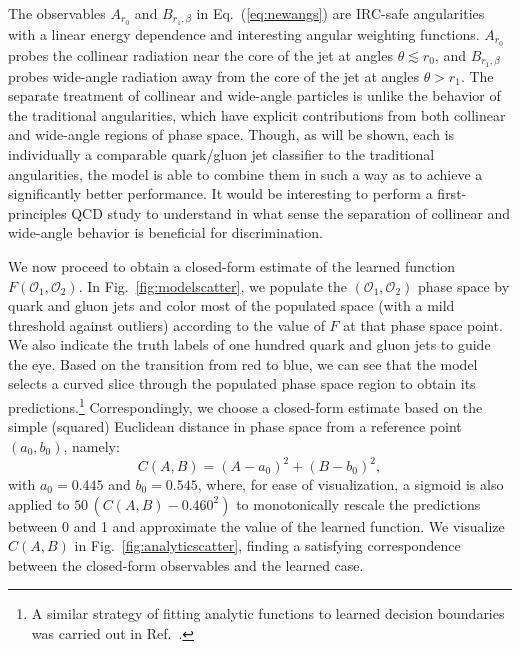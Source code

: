 \documentclass[letterpaper,11pt]{article}
\DeclareRobustCommand{\Fig}[1]{Fig.~\ref{#1}}
\DeclareRobustCommand{\Eq}[1]{Eq.~(\ref{#1})}
\DeclareRobustCommand{\Ref}[1]{Ref.~\cite{#1}}
\begin{document}
The observables $A_{r_0}$ and $B_{r_1,\beta}$ in \Eq{eq:newangs} are IRC-safe angularities with a linear energy dependence and interesting angular weighting functions.
%
$A_{r_0}$ probes the collinear radiation near the core of the jet at angles $\theta \lesssim r_0$, and $B_{r_1,\beta}$ probes wide-angle radiation away from the core of the jet at angles $\theta > r_1$.
%
The separate treatment of collinear and wide-angle particles is unlike the behavior of the traditional angularities, which have explicit contributions from both collinear and wide-angle regions of phase space.
%
Though, as will be shown, each is individually a comparable quark/gluon jet classifier to the traditional angularities, the model is able to combine them in such a way as to achieve a significantly better performance.
%
It would be interesting to perform a first-principles QCD study to understand in what sense the separation of collinear and wide-angle behavior is beneficial for discrimination.


We now proceed to obtain a closed-form estimate of the learned function $F(\mathcal O_1,\mathcal O_2)$.
%
In \Fig{fig:modelscatter}, we populate the $(\mathcal O_1,\mathcal O_2)$ phase space by quark and gluon jets and color most of the populated space (with a mild threshold against outliers) according to the value of $F$ at that phase space point.
%
We also indicate the truth labels of one hundred quark and gluon jets to guide the eye.
%
Based on the transition from red to blue, we can see that the model selects a curved slice through the populated phase space region to obtain its predictions.\footnote{A similar strategy of fitting analytic functions to learned decision boundaries was carried out in \Ref{Likhomanenko:2015aba}.}
%
Correspondingly, we choose a closed-form estimate based on the simple (squared) Euclidean distance in phase space from a reference point $(a_0, b_0)$, namely:
\begin{equation}
\label{eq:estimatedF}
C(A,B) = (A-a_0)^2 + (B-b_0)^2,
\end{equation}
with $a_0=0.445$ and $b_0 = 0.545$, where, for ease of visualization, a sigmoid is also applied to $50\,(C(A,B) - 0.460^2)$ to monotonically rescale the predictions between 0 and 1 and approximate the value of the learned function.
%
We visualize $C(A,B)$ in \Fig{fig:analyticscatter}, finding a satisfying correspondence between the closed-form observables and the learned case.
\end{document}
